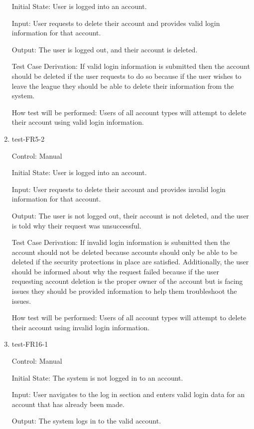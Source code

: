 \documentclass[12pt, titlepage]{article}
\begin{document}
\begin{enumerate}
  Initial State: User is logged into an account.

  Input: User requests to delete their account and provides valid login
  information for that account.

  Output: The user is logged out, and their account is deleted.

  Test Case Derivation: If valid login information is submitted then the
  account should be deleted if the user requests to do so because if the user
  wishes to leave the league they should be able to delete their information
  from the system.

  How test will be performed: Users of all account types will attempt to delete
  their account using valid login information.

  \item{test-FR5-2\\}

  Control: Manual

  Initial State: User is logged into an account.

  Input: User requests to delete their account and provides invalid login
  information for that account.

  Output: The user is not logged out, their account is not deleted, and
  the user is told why their request was unsuccessful.

  Test Case Derivation: If invalid login information is submitted then the
  account should not be deleted because accounts should only be able to be
  deleted if the security protections in place are satisfied. Additionally,
  the user should be informed about why the request failed because if the
  user requesting account deletion is the proper owner of the account but is
  facing issues they should be provided information to help them troubleshoot
  the issues.

  How test will be performed: Users of all account types will attempt to delete
  their account using invalid login information.

  \item{test-FR16-1\\}

  Control: Manual

  Initial State: The system is not logged in to an account.

  Input: User navigates to the log in section and enters valid login data for
  an account that has already been made.

  Output: The system logs in to the valid account.


\end{enumerate}
\end{document}
